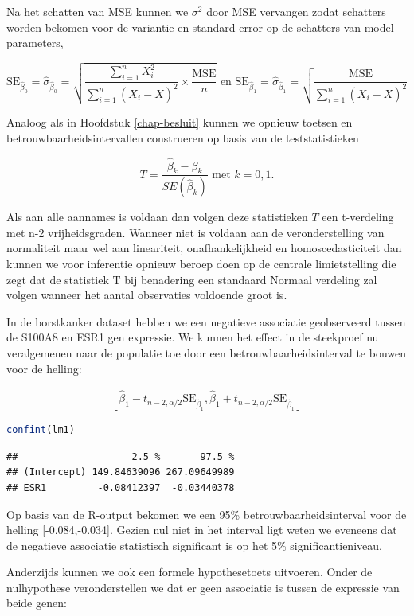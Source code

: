 \documentclass[
  12pt,dutch,coursenotes]{book}
\theoremstyle{definition}
\theoremstyle{definition}
\theoremstyle{definition}
\theoremstyle{definition}
\theoremstyle{remark}
\begin{document}
Na het schatten van MSE kunnen we \(\sigma^2\) door MSE vervangen zodat schatters worden bekomen voor de variantie en standard error op de schatters van model parameters,

\[\text{SE}_{\hat{\beta}_0}=\hat\sigma_{\hat{\beta}_0}=\sqrt{\frac{\sum\limits_{i=1}^n X^2_i}{\sum\limits_{i=1}^n (X_i-\bar X)^2} \times\frac{\text{MSE}}{n}} \text{ en } \text{SE}_{\hat{\beta}_1}=\hat\sigma_{\hat{\beta}_1}=\sqrt{\frac{\text{MSE}}{\sum\limits_{i=1}^n (X_i-\bar X)^2}}\]

Analoog als in Hoofdstuk \ref{chap-besluit} kunnen we opnieuw toetsen en betrouwbaarheidsintervallen construeren op basis van de teststatistieken

\[T=\frac{\hat{\beta}_k-\beta_k}{SE(\hat{\beta}_k)} \text{ met } k=0,1.\]

Als aan alle aannames is voldaan dan volgen deze statistieken \(T\) een t-verdeling met n-2 vrijheidsgraden.
Wanneer niet is voldaan aan de veronderstelling van normaliteit maar wel aan lineariteit, onafhankelijkheid en homoscedasticiteit dan kunnen we voor inferentie opnieuw beroep doen op de centrale limietstelling die zegt dat de statistiek T bij benadering een standaard Normaal verdeling zal volgen wanneer het aantal observaties voldoende groot is.

In de borstkanker dataset hebben we een negatieve associatie geobserveerd tussen de S100A8 en ESR1 gen expressie.
We kunnen het effect in de steekproef nu veralgemenen naar de populatie toe door een betrouwbaarheidsinterval te bouwen voor de helling:

\[[\hat\beta_1 - t_{n-2,\alpha/2} \text{SE}_{\hat\beta_1},\hat\beta_1 + t_{n-2,\alpha/2} \text{SE}_{\hat\beta_1}]\]

\begin{lstlisting}[language=R]
confint(lm1)
\end{lstlisting}

\begin{lstlisting}
##                    2.5 %       97.5 %
## (Intercept) 149.84639096 267.09649989
## ESR1         -0.08412397  -0.03440378
\end{lstlisting}

Op basis van de R-output bekomen we een 95\% betrouwbaarheidsinterval voor de helling {[}-0.084,-0.034{]}.
Gezien nul niet in het interval ligt weten we eveneens dat de negatieve associatie statistisch significant is op het 5\% significantieniveau.

Anderzijds kunnen we ook een formele hypothesetoets uitvoeren. Onder de nulhypothese veronderstellen we dat er geen associatie is tussen de expressie van beide genen:
\end{document}

